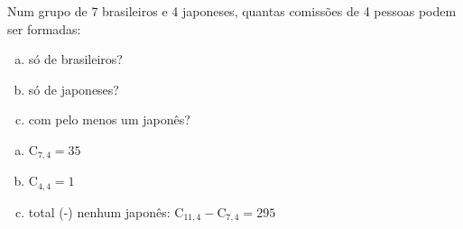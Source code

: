 \begin{ex}
Num grupo de 7 brasileiros e 4 japoneses, quantas comissões de 4 pessoas podem ser formadas:
   \begin{enumerate}[(a)]
   \item só de brasileiros?
   \item só de japoneses?
   \item com pelo menos um japonês?
   \end{enumerate}
     \begin{sol}
       \phantom{A}
         \begin{enumerate} [(a)]
             \item $\mathrm{C}_{7,4}=35$
             \item $\mathrm{C}_{4,4}=1$
             \item total (-) nenhum japonês: $\mathrm{C}_{{11},4}-\mathrm{C}_{7,4}=295$
         \end{enumerate}
     \end{sol}
\end{ex}